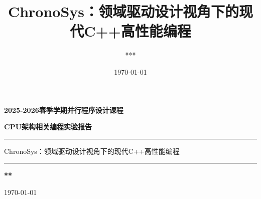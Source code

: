 \documentclass[12pt,a4paper]{ctexart}
\title{ChronoSys：领域驱动设计视角下的现代C++高性能编程}
\author{***}
\date{\today}
\begin{document}
\begin{titlepage}
\centering
\vspace*{2.5cm}
{\Huge\bfseries 2025-2026春季学期并行程序设计课程 \par}
\vspace{0.4cm}
{\LARGE\bfseries CPU架构相关编程实验报告 \par}

\vspace{1.2cm}
\rule{0.88\textwidth}{0.8pt}

\vspace{0.5cm}
{\large ChronoSys：领域驱动设计视角下的现代C++高性能编程 \par}
\vspace{0.4cm}
\rule{0.88\textwidth}{0.8pt}

\vfill
{\Large\bfseries *** \par}
\vspace{0.4cm}
{\large \today \par}
\vspace*{1.0cm}
\end{titlepage}

\tableofcontents
\clearpage
{}


\end{document}

